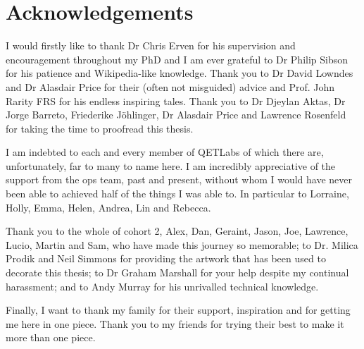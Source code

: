 %
%

\chapter*{Acknowledgements}
I would firstly like to thank Dr Chris Erven for his supervision and encouragement throughout my PhD and I am ever grateful to Dr Philip Sibson for his patience and Wikipedia-like knowledge. Thank you to Dr David Lowndes and Dr Alasdair Price for their (often not misguided) advice and Prof. John Rarity FRS for his endless inspiring tales. Thank you to Dr Djeylan Aktas, Dr Jorge Barreto, Friederike J\"{o}hlinger, Dr Alasdair Price and Lawrence Rosenfeld for taking the time to proofread this thesis.

I am indebted to each and every member of QETLabs of which there are, unfortunately, far to many to name here. 
I am incredibly appreciative of the support from the ops team, past and present, without whom I would have never been able to achieved half of the things I was able to. In particular to Lorraine, Holly, Emma, Helen, Andrea, Lin and Rebecca.

Thank you to the whole of cohort 2, Alex, Dan, Geraint, Jason, Joe, Lawrence, Lucio, Martin and Sam, who have made this journey so memorable; to Dr. Milica Prodik and Neil Simmons for providing the artwork that has been used to decorate this thesis; to Dr Graham Marshall for your help despite my continual harassment; and to Andy Murray for his unrivalled technical knowledge. 

Finally, I want to thank my family for their support, inspiration and for getting me here in one piece. Thank you to my friends for trying their best to make it more than one piece.

\clearpage
